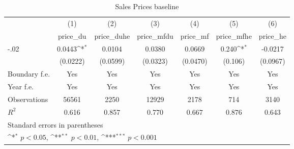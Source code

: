 \begin{table}[htbp]\centering
\def\sym#1{\ifmmode^{#1}\else\(^{#1}\)\fi}
\caption{Sales Prices baseline}
\begin{tabular}{l*{6}{c}}
\hline\hline
                    &\multicolumn{1}{c}{(1)}&\multicolumn{1}{c}{(2)}&\multicolumn{1}{c}{(3)}&\multicolumn{1}{c}{(4)}&\multicolumn{1}{c}{(5)}&\multicolumn{1}{c}{(6)}\\
                    &\multicolumn{1}{c}{price\_du}&\multicolumn{1}{c}{price\_duhe}&\multicolumn{1}{c}{price\_mfdu}&\multicolumn{1}{c}{price\_mf}&\multicolumn{1}{c}{price\_mfhe}&\multicolumn{1}{c}{price\_he}\\
\hline
-.02                &      0.0443\sym{*}  &      0.0104         &      0.0380         &      0.0669         &       0.240\sym{*}  &     -0.0217         \\
                    &    (0.0222)         &    (0.0599)         &    (0.0323)         &    (0.0470)         &     (0.106)         &    (0.0967)         \\
[1em]
Boundary f.e.       &         Yes         &         Yes         &         Yes         &         Yes         &         Yes         &         Yes         \\
[1em]
Year f.e.           &         Yes         &         Yes         &         Yes         &         Yes         &         Yes         &         Yes         \\
\hline
Observations        &       56561         &        2250         &       12929         &        2178         &         714         &        3140         \\
\(R^{2}\)           &       0.616         &       0.857         &       0.770         &       0.667         &       0.876         &       0.643         \\
\hline\hline
\multicolumn{7}{l}{\footnotesize Standard errors in parentheses}\\
\multicolumn{7}{l}{\footnotesize \sym{*} \(p<0.05\), \sym{**} \(p<0.01\), \sym{***} \(p<0.001\)}\\
\end{tabular}
\end{table}
